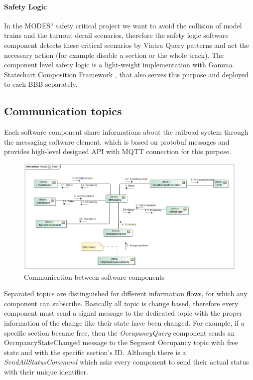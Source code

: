 \paragraph{Safety Logic}
In the MODES$^3$ safety critical project we want to avoid the collision of model trains and the turnout derail scenarios, therefore the safety logic software component detects these critical scenarios by Viatra Query \cite{Viatra} patterns and act the necessary action (for example disable a section or the whole track). The component level safety logic is a light-weight implementation with Gamma Statechart Composition Framework \cite{Gamma}, that also serves this purpose and deployed to each BBB separately.

\subsection{Communication topics}
Each software component share informations about the railroad system through the messaging software element, which is based on protobuf messages and provides high-level designed API with MQTT connection for this purpose. 
\begin{figure}[!h]
	\centering
	\includegraphics[width=150mm, keepaspectratio]{figures/modes3/CommunicationModel.png}
	\caption{Communication between software components}
	\label{fig:communicationModel}
\end{figure}

Separated topics are distinguished for different information flows, for which any component can subscribe. Basically all topic is change based, therefore every component must send a signal message to the dedicated topic with the proper information of the change like their state have been changed. For example, if a specific section became free, then the \textit{OccupancyQuery} component sends an OccupancyStateChanged message to the Segment Occupancy topic with free state and with the specific section's ID. Although there is a \textit{SendAllStatusCommand} which asks every component to send their actual status with their unique identifier.

